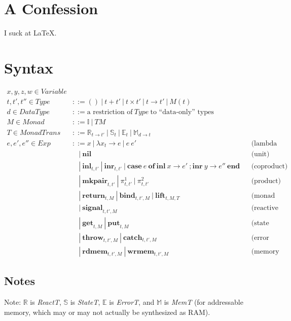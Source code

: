 \documentclass{article}[11pt]
\begin{document}
\section{A Confession}
I suck at \LaTeX.

\section{Syntax}
$$
\begin{aligned}
x,y,z,w \in \mathit{Variable}\\
t,t',t'' \in \mathit{Type} &::= ()~ |~ t + t'~ |~ t \times t'~ |~ t \rightarrow t'~ |~ M(t)\\
d \in \mathit{DataType} &::= \text{a restriction of}~ \mathit{Type}~ \text{to ``data-only'' types}\\
M \in \mathit{Monad} &::= \mathbb{I}~ |~ T M\\
T \in \mathit{MonadTrans} &::= \mathbb{R}_{t\rightarrow{}t'}~ |~ \mathbb{S}_t~ |~ \mathbb{E}_t~ |~ \mathbb{M}_{d\rightarrow{}t}\\
e,e',e'' \in \mathit{Exp}&::= x~ |~ \lambda{}x_t\rightarrow{}e~ |~ e~ e'&&\text{(lambda calculus)}\\
  &~~~~|~ \textbf{nil}&&\text{(unit)}\\
  &~~~~|~ \textbf{inl}_{t,t'}~ |~ \textbf{inr}_{t,t'}~ |~ \textbf{case}~ e~ \textbf{of}~ \textbf{inl}~ x \rightarrow e'~ ; \textbf{inr}~ y \rightarrow e''~ \textbf{end}&&\text{(coproduct)}\\
  &~~~~|~ \textbf{mkpair}_{t,t'}~ |~ \pi^1_{t,t'}~ |~ \pi^2_{t,t'}&&\text{(product)}\\
  &~~~~|~ \textbf{return}_{t,M}~ |~ \textbf{bind}_{t,t',M}~ |~ \textbf{lift}_{t,M,T}&&\text{(monad operators)}\\
  &~~~~|~ \textbf{signal}_{t,t',M}&&\text{(reactive prims.)}\\
  &~~~~|~ \textbf{get}_{t,M}~ |~ \textbf{put}_{t,M}&&\text{(state prims.)}\\
  &~~~~|~ \textbf{throw}_{t,t',M}~ |~ \textbf{catch}_{t,t',M}&&\text{(error prims.)}\\
  &~~~~|~ \textbf{rdmem}_{t,t',M}~ |~ \textbf{wrmem}_{t,t',M}&&\text{(memory prims.)}
\end{aligned}
$$

\subsection{Notes}
Note: $\mathbb{R}$ is {\it ReactT}, $\mathbb{S}$ is {\it StateT}, $\mathbb{E}$ is {\it ErrorT}, and $\mathbb{M}$ is {\it MemT} (for addressable memory, which may or may not actually be synthesized as RAM).
\end{document}
